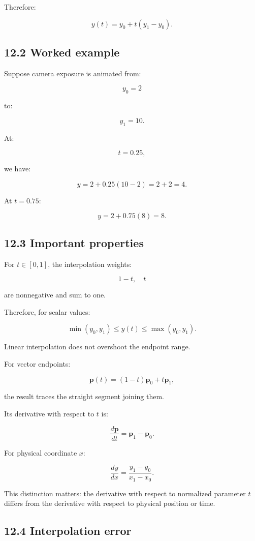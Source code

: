 Therefore:

\[ y(t)=y_0+t(y_1-y_0). \]

\subsection{12.2 Worked example}\label{02-foundations-ii-ch028-worked-example-1}

Suppose camera exposure is animated from:

\[ y_0=2 \]

to:

\[ y_1=10. \]

At:

\[ t=0.25, \]

we have:

\[ y=2+0.25(10-2) =2+2 =\boxed4. \]

At \(t=0.75\):

\[ y=2+0.75(8)=8. \]

\subsection{12.3 Important properties}\label{02-foundations-ii-ch028-important-properties}

For \(t\in[0,1]\), the interpolation weights:

\[ 1-t,\quad t \]

are nonnegative and sum to one.

Therefore, for scalar values:

\[ \boxed{ \min(y_0,y_1)\le y(t)\le\max(y_0,y_1) }. \]

Linear interpolation does not overshoot the endpoint range.

For vector endpoints:

\[ \mathbf p(t)=(1-t)\mathbf p_0+t\mathbf p_1, \]

the result traces the straight segment joining them.

Its derivative with respect to \(t\) is:

\[ \boxed{ \frac{d\mathbf p}{dt} = \mathbf p_1-\mathbf p_0 }. \]

For physical coordinate \(x\):

\[ \boxed{ \frac{dy}{dx} = \frac{y_1-y_0}{x_1-x_0} }. \]

This distinction matters: the derivative with respect to normalized parameter \(t\) differs from the derivative with respect to physical position or time.

\subsection{12.4 Interpolation error}\label{02-foundations-ii-ch028-interpolation-error}

